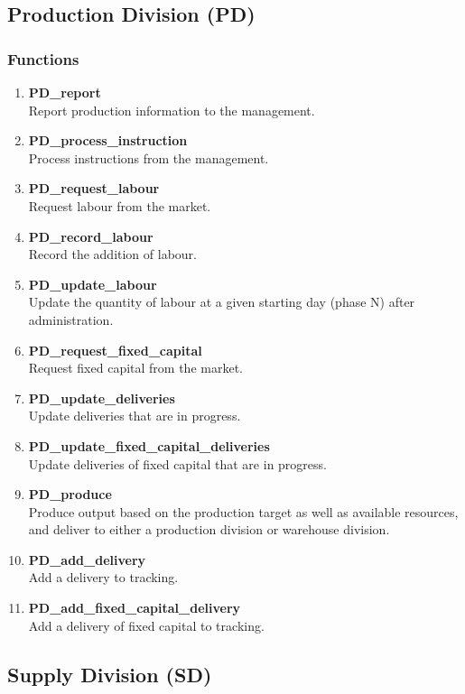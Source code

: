 \documentclass[11pt]{article}
\begin{document}
\subsection{Production Division (PD)}

\subsubsection{Functions}
\begin{enumerate}
	\item \textbf{PD\_report} \\
	Report production information to the management.
	\item \textbf{PD\_process\_instruction} \\
	Process instructions from the management.
	\item \textbf{PD\_request\_labour} \\
	Request labour from the market.
	\item \textbf{PD\_record\_labour} \\
	Record the addition of labour.
	\item \textbf{PD\_update\_labour} \\
	Update the quantity of labour at a given starting day (phase N) after administration.
	\item \textbf{PD\_request\_fixed\_capital} \\
	Request fixed capital from the market.
	\item \textbf{PD\_update\_deliveries} \\
	Update deliveries that are in progress.
	\item \textbf{PD\_update\_fixed\_capital\_deliveries} \\
	Update deliveries of fixed capital that are in progress.
	\item \textbf{PD\_produce} \\
	Produce output based on the production target as well as available resources, and deliver to either a production division or warehouse division.
	\item \textbf{PD\_add\_delivery} \\
	Add a delivery to tracking.
	\item \textbf{PD\_add\_fixed\_capital\_delivery} \\
	Add a delivery of fixed capital to tracking.
\end{enumerate}

\subsection{Supply Division (SD)}
\end{document}
